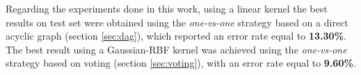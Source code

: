 \documentclass[10pt,a4paper]{article}
\begin{document}
Regarding the experiments done in this work, using a linear kernel the best results on test set were obtained using the \emph{one-vs-one} strategy based on a direct acyclic graph (section \ref{sec:dag}), which reported an error rate equal to \textbf{13.30\%}. The best result using a Gaussian-RBF kernel was achieved using the \emph{one-vs-one} strategy based on voting (section \ref{sec:voting}), with an error rate equal to \textbf{9.60\%}.



\end{document}
